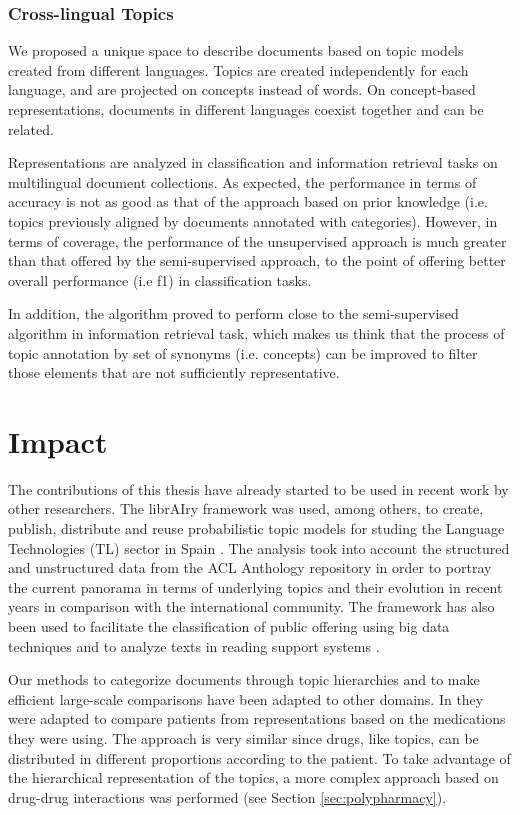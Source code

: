 \subsubsection{Cross-lingual Topics}

We proposed a unique space to describe documents based on topic models created from different languages. Topics are created independently for each language, and are projected on concepts instead of words. On concept-based representations, documents in different languages coexist together and can be related.

Representations are analyzed in classification and information retrieval tasks on multilingual document collections. As expected, the performance in terms of accuracy is not as good as that of the approach based on prior knowledge (i.e. topics previously aligned by documents annotated with categories). However, in terms of coverage, the performance of the unsupervised approach is much greater than that offered by the semi-supervised approach, to the point of offering better overall performance (i.e f1) in classification tasks. 

In addition, the algorithm proved to perform close to the semi-supervised algorithm in information retrieval task, which makes us think that the process of topic annotation by set of synonyms (i.e. concepts) can be improved to filter those elements that are not sufficiently representative.


\section{Impact}

The contributions of this thesis have already started to be used in recent work by other researchers. The librAIry framework was used, among others, to create, publish, distribute and reuse probabilistic topic models for studing the Language Technologies (TL) sector in Spain \citep{Samy2019}. The analysis took into account  the structured and unstructured data from the ACL Anthology repository in order to portray the current panorama in terms of underlying topics and their evolution in recent years in comparison with the international community. The framework has also been used to facilitate the classification of public offering using big data techniques \citep{Olga2019} and to analyze texts in reading support systems \citep{Teresa2020}.

Our methods to categorize documents through topic hierarchies and to make efficient large-scale comparisons  have been adapted to other domains. In \citep{Badenes-Olmedo2019c} they were adapted to compare patients from representations based on the medications they were using. The approach is very similar since drugs, like topics, can be distributed in different proportions according to the patient. To take advantage of the hierarchical representation of the topics, a more complex approach based on drug-drug interactions was performed (see Section \ref{sec:polypharmacy}).

